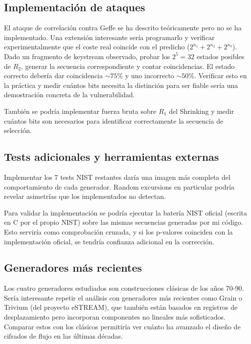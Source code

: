 \subsection{Implementación de ataques}

El ataque de correlación contra Geffe se ha descrito teóricamente pero no se ha implementado.
Una extensión interesante sería programarlo y verificar experimentalmente que el coste real coincide con el predicho ($2^{n_1} + 2^{n_2} + 2^{n_3}$).
Dado un fragmento de keystream observado, probar los $2^5 = 32$ estados posibles de $R_2$, generar la secuencia correspondiente y contar coincidencias.
El estado correcto debería dar coincidencia $\sim 75\%$ y uno incorrecto $\sim 50\%$.
Verificar esto en la práctica y medir cuántos bits necesita la distinción para ser fiable sería una demostración concreta de la vulnerabilidad.

También se podría implementar fuerza bruta sobre $R_1$ del Shrinking y medir cuántos bits son necesarios para identificar correctamente la secuencia de selección.

\subsection{Tests adicionales y herramientas externas}

Implementar los 7 tests NIST restantes daría una imagen más completa del comportamiento de cada generador.
Random excursions en particular podría revelar asimetrías que los implementados no detectan.

Para validar la implementación se podría ejecutar la batería NIST oficial (escrita en C por el propio NIST) sobre las mismas secuencias generadas por mi código.
Esto serviría como comprobación cruzada, y si los p-valores coinciden con la implementación oficial,
se tendría confianza adicional en la corrección.

\subsection{Generadores más recientes}

Los cuatro generadores estudiados son construcciones clásicas de los años 70-90.
Sería interesante repetir el análisis con generadores más recientes como Grain o Trivium (del proyecto eSTREAM),
que también están basados en registros de desplazamiento pero incorporan componentes no lineales más sofisticados.
Comparar estos con los clásicos permitiría ver cuánto ha avanzado el diseño de cifrados de flujo en las últimas décadas.

